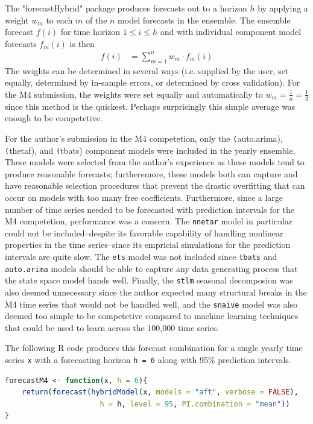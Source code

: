 \documentclass[11pt,3p,review,authoryear]{elsarticle}
\begin{document}
The "forecastHybrid" package produces forecasts out to a horizon $h$ by applying a weight $w_m$ to each $m$ of the $n$ model forecasts in the ensemble. The ensemble forecast $f(i)$ for time horizon $1 \leq i \leq h$ and with individual component model forecasts $f_m(i)$ is then
\begin{align}
f(i) & = \sum_{m=1}^n w_m\cdot f_m(i)
\end{align}
The weights can be determined in several ways (i.e. supplied by the user, set equally, determined by in-sample errors, or determined by cross validation). For the M4 submission, the weights were set equally and automatically to $w_m = \frac{1}{n} = \frac{1}{3}$ since this method is the quickest. Perhaps surprisingly this simple average was enough to be competetive.

For the author's submission in the M4 competetion, only the \texttt(auto.arima), \texttt(thetaf), and \texttt(tbats) component models were included in the yearly ensemble. These models were selected from the author's experience as these models tend to produce reasonable forecasts; furtheremore, these models both can capture and have reasonable selection procedures that prevent the drastic overfitting that can occur on models with too many free coefficients. Furthermore, since a large number of time series needed to be forecasted with prediction intervals for the M4 competetion, performance was a concern. The \texttt{nnetar} model in particular could not be included--despite its favorable capability of handling nonlinear properties in the time series--since its empricial simulations for the prediction intervals are quite slow. The \texttt{ets} model was not included since \texttt{tbats} and \texttt{auto.arima} models should be able to capture any data generating process that the state space model hands well. Finally, the \texttt{stlm} seasonal decomposion was also deemed unnecessary since the author expected many structural breaks in the M4 time series that would not be handled well, and the \texttt{snaive} model was also deemed too simple to be competetive compared to machine learning techniques that could be used to learn across the 100,000 time series.

The following R code produces this forecast combination for a single yearly time series \lstinline{x} with a forecasting horizon \lstinline{h = 6} along with 95\% prediction intervals.
\begin{lstlisting}[language=R]
forecastM4 <- function(x, h = 6){
    return(forecast(hybridModel(x, models = "aft", verbose = FALSE),
                      h = h, level = 95, PI.combination = "mean"))
}
\end{lstlisting}
\end{document}
